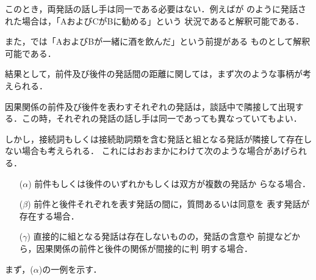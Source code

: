
このとき，両発話の話し手は同一である必要はない．例えばが
のように発話された場合は，「AおよびCがBに勧める」という
状況であると解釈可能である．


また，では「AおよびBが一緒に酒を飲んだ」という前提がある
ものとして解釈可能である．


結果として，前件及び後件の発話間の距離に関しては，まず次のような事柄が考
えられる．

\begin{screen}
 \begin{obs}
  因果関係の前件及び後件を表わすそれぞれの発話は，談話中で隣接して出現す
  る．この時，それぞれの発話の話し手は同一であっても異なっていてもよい．
 \end{obs}
\end{screen}

しかし，接続詞もしくは接続助詞類を含む発話と組となる発話が隣接して存在し
ない場合も考えられる．
これにはおおまかにわけて次のような場合があげられる．
\begin{itemize}
 \item[($\alpha$)] 前件もしくは後件のいずれかもしくは双方が複数の発話か
		   らなる場合．
 \item[($\beta$)] 前件と後件それぞれを表す発話の間に，質問あるいは同意を
		   表す発話が存在する場合．
 \item[($\gamma$)] 直接的に組となる発話は存在しないものの，発話の含意や
		   前提などから，因果関係の前件と後件の関係が間接的に判
		   明する場合．
\end{itemize}

まず，($\alpha$)の一例を示す．


